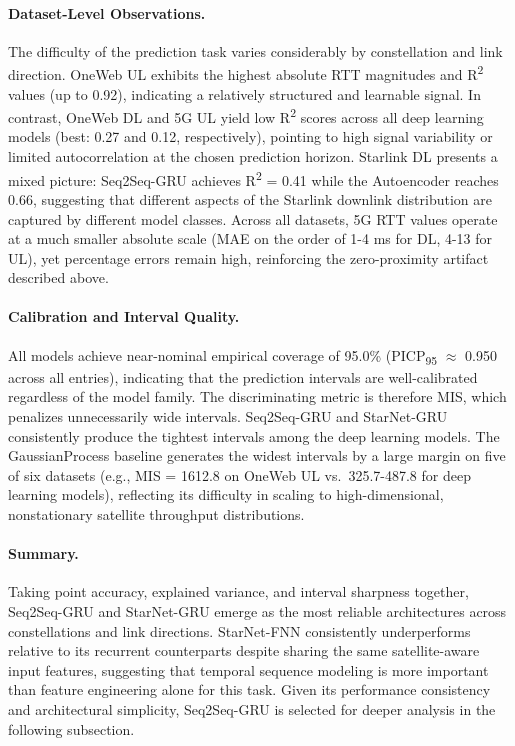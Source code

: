 \documentclass[12pt]{article}
\begin{document}
\paragraph{Dataset-Level Observations.}
The difficulty of the prediction task varies considerably by constellation and link direction. OneWeb UL exhibits the highest absolute RTT magnitudes and R\textsuperscript{2} values (up to 0.92), indicating a relatively structured and learnable signal. In contrast, OneWeb DL and 5G UL yield low R\textsuperscript{2} scores across all deep learning models (best: 0.27 and 0.12, respectively), pointing to high signal variability or limited autocorrelation at the chosen prediction horizon. Starlink DL presents a mixed picture: Seq2Seq-GRU achieves R\textsuperscript{2} = 0.41 while the Autoencoder reaches 0.66, suggesting that different aspects of the Starlink downlink distribution are captured by different model classes. Across all datasets, 5G RTT values operate at a much smaller absolute scale (MAE on the order of 1-4 ms for DL, 4-13 for UL), yet percentage errors remain high, reinforcing the zero-proximity artifact described above.

\paragraph{Calibration and Interval Quality.}
All models achieve near-nominal empirical coverage of 95.0\% (PICP\textsubscript{95} $\approx$ 0.950 across all entries), indicating that the prediction intervals are well-calibrated regardless of the model family. The discriminating metric is therefore MIS, which penalizes unnecessarily wide intervals. Seq2Seq-GRU and StarNet-GRU consistently produce the tightest intervals among the deep learning models. The GaussianProcess baseline generates the widest intervals by a large margin on five of six datasets (e.g., MIS = 1612.8 on OneWeb UL vs.\ 325.7-487.8 for deep learning models), reflecting its difficulty in scaling to high-dimensional, nonstationary satellite throughput distributions.

\paragraph{Summary.}
Taking point accuracy, explained variance, and interval sharpness together, Seq2Seq-GRU and StarNet-GRU emerge as the most reliable architectures across constellations and link directions. StarNet-FNN consistently underperforms relative to its recurrent counterparts despite sharing the same satellite-aware input features, suggesting that temporal sequence modeling is more important than feature engineering alone for this task. Given its performance consistency and architectural simplicity, Seq2Seq-GRU is selected for deeper analysis in the following subsection.
\end{document}
